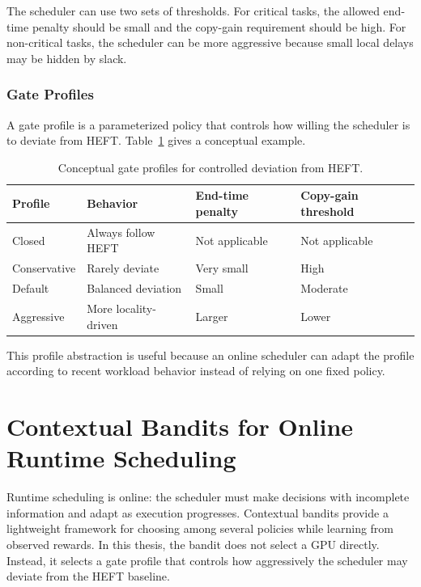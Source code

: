 The scheduler can use two sets of thresholds. For critical tasks, the allowed end-time penalty should be small and the copy-gain requirement should be high. For non-critical tasks, the scheduler can be more aggressive because small local delays may be hidden by slack.

\subsubsection{Gate Profiles}
\label{subsubsec:gate_profiles}

A gate profile is a parameterized policy that controls how willing the scheduler is to deviate from HEFT. Table~\ref{tab:gate_profiles_theory} gives a conceptual example.

\begin{table}[!htbp]
\centering
\footnotesize
\begin{tabular}{@{}llll@{}}
\toprule
Profile & Behavior & End-time penalty & Copy-gain threshold \\
\midrule
Closed & Always follow HEFT & Not applicable & Not applicable \\
Conservative & Rarely deviate & Very small & High \\
Default & Balanced deviation & Small & Moderate \\
Aggressive & More locality-driven & Larger & Lower \\
\bottomrule
\end{tabular}
\caption{Conceptual gate profiles for controlled deviation from HEFT.}
\label{tab:gate_profiles_theory}
\end{table}

This profile abstraction is useful because an online scheduler can adapt the profile according to recent workload behavior instead of relying on one fixed policy.

\section{Contextual Bandits for Online Runtime Scheduling}
\label{sec:theory_contextual_bandits}

Runtime scheduling is online: the scheduler must make decisions with incomplete information and adapt as execution progresses. Contextual bandits provide a lightweight framework for choosing among several policies while learning from observed rewards. In this thesis, the bandit does not select a GPU directly. Instead, it selects a gate profile that controls how aggressively the scheduler may deviate from the HEFT baseline.

